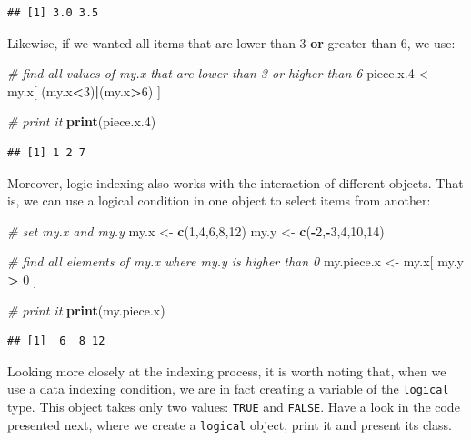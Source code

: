 \documentclass[11pt,]{book}
\newenvironment{Shaded}{\begin{snugshade}}{\end{snugshade}}
\newcommand{\KeywordTok}[1]{\textcolor[rgb]{0.27,0.27,0.27}{\textbf{#1}}}
\newcommand{\DecValTok}[1]{\textcolor[rgb]{0.06,0.06,0.06}{#1}}
\newcommand{\StringTok}[1]{\textcolor[rgb]{0.5,0.5,0.5}{#1}}
\newcommand{\CommentTok}[1]{\textcolor[rgb]{0.56,0.35,0.01}{\textit{#1}}}
\newcommand{\OperatorTok}[1]{\textcolor[rgb]{0.81,0.36,0.00}{\textbf{#1}}}
\newcommand{\NormalTok}[1]{#1}
\begin{document}
\begin{verbatim}
## [1] 3.0 3.5
\end{verbatim}

Likewise, if we wanted all items that are lower than 3 \textbf{or}
greater than 6, we use:

\begin{Shaded}
\begin{Highlighting}[]
\CommentTok{# find all values of my.x that are lower than 3 or higher than 6}
\NormalTok{piece.x.}\DecValTok{4}\NormalTok{ <-}\StringTok{ }\NormalTok{my.x[ (my.x}\OperatorTok{<}\DecValTok{3}\NormalTok{)}\OperatorTok{|}\NormalTok{(my.x}\OperatorTok{>}\DecValTok{6}\NormalTok{) ]}

\CommentTok{# print it}
\KeywordTok{print}\NormalTok{(piece.x.}\DecValTok{4}\NormalTok{)}
\end{Highlighting}
\end{Shaded}

\begin{verbatim}
## [1] 1 2 7
\end{verbatim}

Moreover, logic indexing also works with the interaction of different
objects. That is, we can use a logical condition in one object to select
items from another:

\begin{Shaded}
\begin{Highlighting}[]
\CommentTok{# set my.x and my.y}
\NormalTok{my.x <-}\StringTok{ }\KeywordTok{c}\NormalTok{(}\DecValTok{1}\NormalTok{,}\DecValTok{4}\NormalTok{,}\DecValTok{6}\NormalTok{,}\DecValTok{8}\NormalTok{,}\DecValTok{12}\NormalTok{)}
\NormalTok{my.y <-}\StringTok{ }\KeywordTok{c}\NormalTok{(}\OperatorTok{-}\DecValTok{2}\NormalTok{,}\OperatorTok{-}\DecValTok{3}\NormalTok{,}\DecValTok{4}\NormalTok{,}\DecValTok{10}\NormalTok{,}\DecValTok{14}\NormalTok{)}

\CommentTok{# find all elements of my.x where my.y is higher than 0}
\NormalTok{my.piece.x <-}\StringTok{ }\NormalTok{my.x[ my.y }\OperatorTok{>}\StringTok{ }\DecValTok{0}\NormalTok{ ]}

\CommentTok{# print it}
\KeywordTok{print}\NormalTok{(my.piece.x)}
\end{Highlighting}
\end{Shaded}

\begin{verbatim}
## [1]  6  8 12
\end{verbatim}

Looking more closely at the indexing process, it is worth noting that,
when we use a data indexing condition, we are in fact creating a
variable of the \texttt{logical} type. This object takes only two
values: \texttt{TRUE} and \texttt{FALSE}. Have a look in the code
presented next, where we create a \texttt{logical} object, print it and
present its class.
\end{document}
